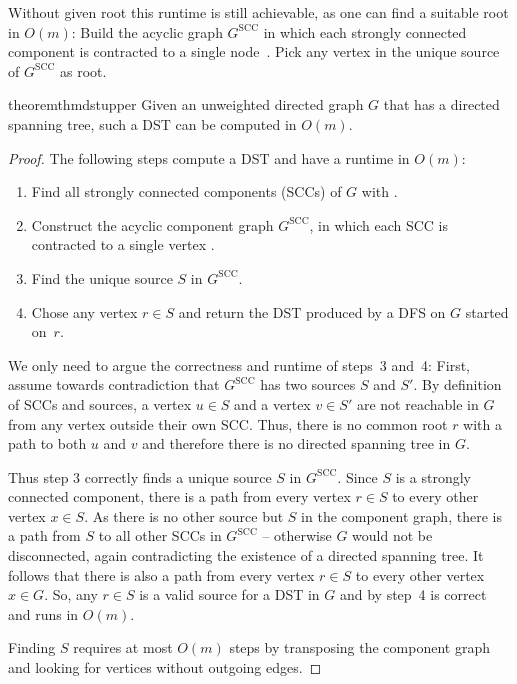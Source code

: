 \documentclass[a4paper, USenglish, cleveref, autoref, thm-restate]{lipics-v2021}
\begin{document}
Without given root this runtime is still achievable, as one can find a suitable root in $O(m)$:
Build the acyclic graph $G^\textrm{SCC}$ in which each strongly connected component is contracted to a single node~\cite{cormenIntroductionAlgorithms2022}.
Pick any vertex in the unique source of $G^\textrm{SCC}$ as root.

\begin{restatable}{theorem}{thmdstupper}
	\label{thm:dst-upper}
	Given an unweighted directed graph $G$ that has a directed spanning tree, such a DST can be computed in $O(m)$.
\end{restatable}
\begin{proof}
	The following steps compute a DST and  have a runtime in $O(m)$:
	\begin{enumerate}
		\item Find all strongly connected components (SCCs) of $G$ with \cite{tarjanDepthFirstSearchLinear1972,cormenIntroductionAlgorithms2022}.
		\item Construct the acyclic component graph $G^\textrm{SCC}$, in which each SCC is contracted to a single vertex \cite{cormenIntroductionAlgorithms2022}.
		\item Find the unique source $S$ in $G^\textrm{SCC}$.
		\item Chose any vertex $r \in S$ and return the DST produced by a DFS on $G$ started on~$r$.
	\end{enumerate}
	
	We only need to argue the correctness and runtime of steps~3 and~4: First, assume towards contradiction that $G^\textrm{SCC}$ has two sources $S$ and $S'$.
	By definition of SCCs and sources, a vertex $u \in S$ and a vertex $v \in S'$ are not reachable in $G$ from any vertex outside their own SCC.
	Thus, there is no common root $r$ with a path to both $u$ and $v$ and therefore there is no directed spanning tree in $G$.
	
	Thus step 3 correctly finds a  unique source $S$ in  $G^\textrm{SCC}$.
	Since $S$ is a strongly connected component, there is a path from every vertex $r \in S$ to every other vertex $x \in S$.
	As there is no other source but $S$ in the component graph, there is a path from $S$ to all other SCCs in $G^\textrm{SCC}$ -- otherwise $G$ would not be disconnected, again contradicting the existence of a directed spanning tree. 
	It follows that there is also a path from every vertex $r \in S$ to every other vertex $x \in G$.
	So, any $r \in S$ is a valid source for a DST in $G$ and by  step~4 is correct and runs in $O(m)$.
	
	Finding $S$ requires at most $O(m)$ steps by transposing the component graph and looking for vertices without outgoing edges.
\end{proof}
\end{document}
